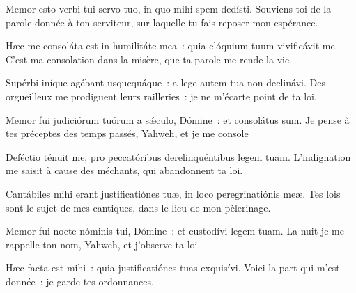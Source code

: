 \begin{paracol}{2}

\LigneParacol{0cm}
{Memor esto verbi tui servo tuo, \GreStar{} in quo mihi spem dedísti.}
{Souviens-toi de la parole donnée à ton serviteur, sur laquelle tu fais reposer mon espérance.}

\LigneParacol{0.2cm}
{Hæc me consoláta est in humilitáte mea~: \GreStar{} quia elóquium tuum vivificávit me.}
{C'est ma consolation dans la misère, que ta parole me rende la vie.}

\LigneParacol{0.2cm}
{Supérbi iníque agébant usquequáque~: \GreStar{} a lege autem tua non declinávi.}
{Des orgueilleux me prodiguent leurs railleries~: je ne m'écarte point de ta loi.}

\LigneParacol{0.2cm}
{Memor fui judiciórum tuórum a sǽculo, Dómine~: \GreStar{} et consolátus sum.}
{Je pense à tes préceptes des temps passés, Yahweh, et je me console}

\LigneParacol{0.2cm}
{Deféctio ténuit me, \GreStar{} pro peccatóribus derelinquéntibus legem tuam.}
{L'indignation me saisit à cause des méchants, qui abandonnent ta loi.}

\LigneParacol{0.2cm}
{Cantábiles mihi erant justificatiónes tuæ, \GreStar{} in loco peregrinatiónis meæ.}
{Tes lois sont le sujet de mes cantiques, dans le lieu de mon pèlerinage.}

\LigneParacol{0.2cm}
{Memor fui nocte nóminis tui, Dómine~: \GreStar{} et custodívi legem tuam.}
{La nuit je me rappelle ton nom, Yahweh, et j'observe ta loi.}

\LigneParacol{0.2cm}
{Hæc facta est mihi~: \GreStar{} quia justificatiónes tuas exquisívi.}
{Voici la part qui m'est donnée~: je garde tes ordonnances.}

\end{paracol}
